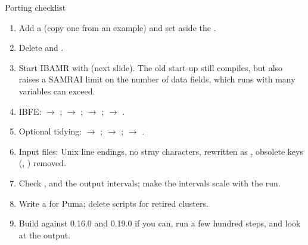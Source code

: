 \documentclass[aspectratio=169,11pt]{beamer}
\begin{document}
\begin{frame}{Porting checklist}
\small
\begin{enumerate}
  \item Add a  (copy one from an example) and set aside the .
  \item Delete  and .
  \item Start IBAMR with  (next slide). The old start-up still compiles, but  also raises a SAMRAI limit on the number of data fields, which runs with many variables can exceed.
  \item IBFE:  $\to$ ;  $\to$ ;  $\to$ ;  $\to$ .
  \item Optional tidying:  $\to$ ;  $\to$ ;  $\to$ .
  \item Input files: Unix line endings, no stray characters,  rewritten as , obsolete keys (, ) removed.
  \item Check ,  and the output intervals; make the intervals scale with the run.
  \item Write a  for Puma; delete scripts for retired clusters.
  \item Build against 0.16.0 and 0.19.0 if you can, run a few hundred steps, and look at the output.
\end{enumerate}
\end{frame}
\end{document}

